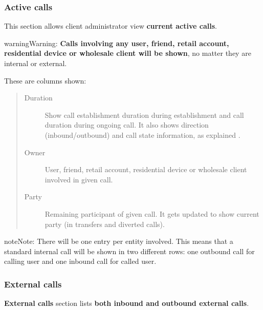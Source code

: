 \documentclass[letterpaper,10pt,english]{sphinxmanual}
\begin{document}
\subsubsection{Active calls}
\label{administration_portal/client/retail/calls/active_calls::doc}\label{administration_portal/client/retail/calls/active_calls:active-calls}
This section allows client administrator view \textbf{current active calls}.

\begin{notice}{warning}{Warning:}
\textbf{Calls involving any user, friend, retail account, residential device or wholesale client will be shown},
no matter they are internal or external.
\end{notice}

These are columns shown:
\begin{quote}
\begin{description}
\item[{Duration}] \leavevmode
Show call establishment duration during establishment and call duration during ongoing call. It also shows
direction (inbound/outbound) and call state information, as explained {\hyperref[administration_portal/platform/active_calls:call\string-state]{}}.

\item[{Owner}] \leavevmode
User, friend, retail account, residential device or wholesale client involved in given call.

\item[{Party}] \leavevmode
Remaining participant of given call. It gets updated to show current party (in transfers and diverted calls).

\end{description}
\end{quote}

\begin{notice}{note}{Note:}
There will be one entry per entity involved. This means that a standard internal call will be shown
in two different rows: one outbound call for calling user and one inbound call for called user.
\end{notice}


\subsubsection{External calls}
\label{administration_portal/client/retail/calls/external_calls::doc}\label{administration_portal/client/retail/calls/external_calls:external-calls}
\textbf{External calls} section lists \textbf{both inbound and outbound external calls}.
\end{document}
